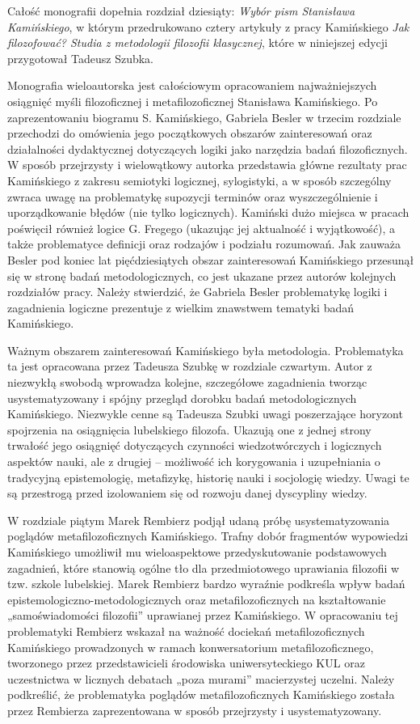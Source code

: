 \documentclass[a4paper]{article}
\begin{document}
Całość monografii dopełnia rozdział dziesiąty: \textit{Wybór pism Stanisława Kamińskiego}, w którym przedrukowano cztery
artykuły z pracy Kamińskiego \textit{Jak filozofować? Studia z metodologii filozofii klasycznej}, które w niniejszej
edycji przygotował Tadeusz Szubka.

Monografia wieloautorska jest całościowym opracowaniem najważniejszych osiągnięć myśli filozoficznej i metafilozoficznej
Stanisława Kamińskiego. Po zaprezentowaniu biogramu S. Kamińskiego, Gabriela Besler w trzecim rozdziale przechodzi do
omówienia jego początkowych obszarów zainteresowań oraz działalności dydaktycznej dotyczących logiki jako narzędzia
badań filozoficznych. W sposób przejrzysty i wielowątkowy autorka przedstawia główne rezultaty prac Kamińskiego z
zakresu semiotyki logicznej, sylogistyki, a w sposób szczególny zwraca uwagę na problematykę supozycji terminów oraz
wyszczególnienie i uporządkowanie błędów (nie tylko logicznych). Kamiński dużo miejsca w pracach poświęcił również
logice G. Fregego (ukazując jej aktualność i wyjątkowość), a także problematyce definicji oraz rodzajów i podziału
rozumowań. Jak zauważa Besler pod koniec lat pięćdziesiątych obszar zainteresowań Kamińskiego przesunął się w stronę
badań metodologicznych, co jest ukazane przez autorów kolejnych rozdziałów pracy. Należy stwierdzić, że Gabriela Besler
problematykę logiki i zagadnienia logiczne prezentuje z wielkim znawstwem tematyki badań Kamińskiego. 

Ważnym obszarem zainteresowań Kamińskiego była metodologia. Problematyka ta jest opracowana przez Tadeusza Szubkę w
rozdziale czwartym. Autor z niezwykłą swobodą wprowadza kolejne, szczegółowe zagadnienia tworząc usystematyzowany i
spójny przegląd dorobku badań metodologicznych Kamińskiego. Niezwykle cenne są Tadeusza Szubki uwagi poszerzające
horyzont spojrzenia na osiągnięcia lubelskiego filozofa. Ukazują one z jednej strony trwałość jego osiągnięć
dotyczących czynności wiedzotwórczych i logicznych aspektów nauki, ale z drugiej – możliwość ich korygowania i
uzupełniania o tradycyjną epistemologię, metafizykę, historię nauki i socjologię wiedzy. Uwagi te są przestrogą przed
izolowaniem się od rozwoju danej dyscypliny wiedzy.

W rozdziale piątym Marek Rembierz podjął udaną próbę usystematyzowania poglądów metafilozoficznych Kamińskiego. Trafny
dobór fragmentów wypowiedzi Kamińskiego umożliwił mu wieloaspektowe przedyskutowanie podstawowych zagadnień, które
stanowią ogólne tło dla przedmiotowego uprawiania filozofii w tzw. szkole lubelskiej. Marek Rembierz bardzo wyraźnie
podkreśla wpływ badań epistemologiczno-metodologicznych oraz metafilozoficznych na kształtowanie „samoświadomości
filozofii” uprawianej przez Kamińskiego. W opracowaniu tej problematyki Rembierz wskazał na ważność dociekań
metafilozoficznych Kamińskiego prowadzonych w ramach konwersatorium metafilozoficznego, tworzonego przez
przedstawicieli środowiska uniwersyteckiego KUL oraz uczestnictwa w licznych debatach „poza murami” macierzystej
uczelni. Należy podkreślić, że problematyka poglądów metafilozoficznych Kamińskiego została przez Rembierza
zaprezentowana w sposób przejrzysty i usystematyzowany.
\end{document}

